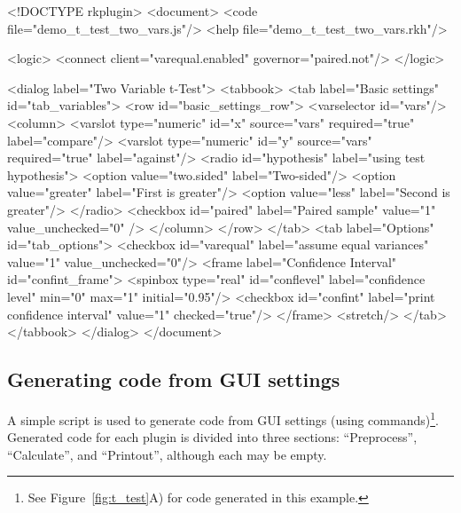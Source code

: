 \begin{footnotesize}
\begin{Code}
<!DOCTYPE rkplugin>
<document>
  <code file="demo_t_test_two_vars.js"/>
  <help file="demo_t_test_two_vars.rkh"/>

  <logic>
    <connect client="varequal.enabled" governor="paired.not"/>
  </logic>

  <dialog label="Two Variable t-Test">
    <tabbook>
      <tab label="Basic settings" id="tab_variables">
        <row id="basic_settings_row">
          <varselector id="vars"/>
          <column>
            <varslot type="numeric" id="x" source="vars" required="true"
              label="compare"/>                                                             
            <varslot type="numeric" id="y" source="vars" required="true"
              label="against"/>
            <radio id="hypothesis" label="using test hypothesis">
              <option value="two.sided" label="Two-sided"/>
              <option value="greater" label="First is greater"/>
              <option value="less" label="Second is greater"/>
            </radio>
            <checkbox id="paired" label="Paired sample" value="1" value_unchecked="0" />
          </column>
        </row>
      </tab>
      <tab label="Options" id="tab_options">
        <checkbox id="varequal" label="assume equal variances" value="1"
          value_unchecked="0"/>
        <frame label="Confidence Interval" id="confint_frame">
          <spinbox type="real" id="conflevel" label="confidence level" min="0" max="1"
            initial="0.95"/>
          <checkbox id="confint" label="print confidence interval" value="1"
            checked="true"/>
        </frame>
        <stretch/>
      </tab>
    </tabbook>
  </dialog>
</document>
\end{Code}
\end{footnotesize}

\subsection[Generating R code from GUI settings]{Generating  code from GUI settings}
\label{sec:generating_r_code_from_ui_settings}
A simple  script is used to generate  code from GUI settings (using  commands)\footnote{
  See Figure~\ref{fig:t_test}A) for code generated in this example.
}. Generated code for each plugin is divided into three sections: ``Preprocess'', ``Calculate'', and ``Printout'', although each
may be empty.

